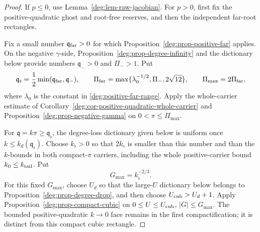 \begin{proof}
If \(p\le0\), use Lemma~\ref{deg:lem-raw-jacobian}. For \(p>0\),
first fix the positive-quadratic ghost and root-free reserves, and then
the independent far-root rectangles.

Fix a small number \(\mathfrak q_{\rm far}>0\) for which
Proposition~\ref{deg:prop-positive-far} applies.  On the negative
\(\gamma\)-side, Proposition~\ref{deg:prop-degree-infinity} and the
dictionary below provide numbers \(\mathfrak q_- >0\) and
\(\Pi_->1\).  Put
\begin{equation}
 \mathfrak q_\flat=\frac12\min(\mathfrak q_{\rm far},\mathfrak q_-),\qquad
 \Pi_{\rm far}=\max\{\lambda_0^{-1/2},\Pi_-,2\sqrt{12}\},
 \qquad \Pi_{\max}=2\Pi_{\rm far},
 \label{deg:small-constant-1}
\end{equation}
where \(\lambda_0\) is the constant in
\eqref{deg:positive-far-range}. Apply the whole-carrier estimate of
Corollary~\ref{deg:cor-positive-quadratic-whole-carrier} and
Proposition~\ref{deg:prop-negative-gamma} on
\(0<\pi\le\Pi_{\max}\).

For \(\mathfrak q=k\pi\ge \mathfrak q_\flat\), the degree-loss dictionary given below is
uniform once \(k\le k_d(\mathfrak q_\flat)\).  Choose
\(k_\flat>0\) so that \(2k_\flat\) is smaller than this number and than
the \(k\)-bounds in both compact-\(\pi\) carriers, including the
whole positive-carrier bound \(k_0\le k_{\rm tail}\).  Put
\begin{equation}
 G_{\max}=k_\flat^{-2/3}.
 \label{deg:small-Gmax}
\end{equation}
For this fixed \(G_{\max}\), choose \(U_d\) so that the large-\(U\)
dictionary below belongs to Proposition~\ref{deg:prop-degree-drop}, and
then choose \(U_{\rm cub}>U_d+1\).  Apply Proposition~\ref{deg:prop-compact-cubic} on
\(0\le U\le U_{\rm cub}\), \(|G|\le G_{\max}\). The bounded
positive-quadratic \(k\to0\) face remains in the first compactification;
it is distinct from this compact cubic rectangle.


\end{proof}
